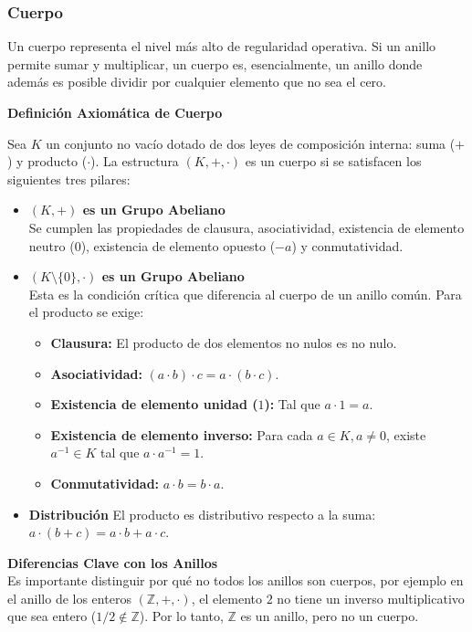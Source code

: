 \documentclass{article}
\begin{document}
\subsubsection{Cuerpo}
\label{sec:cuerpo}    
Un cuerpo representa el nivel más alto de regularidad operativa. Si un anillo permite sumar y multiplicar, un cuerpo es, esencialmente, un anillo donde además es posible dividir por cualquier elemento que no sea el cero.

\textbf{Definición Axiomática de Cuerpo}

Sea $K$ un conjunto no vacío dotado de dos leyes de composición interna: suma ($+$) y producto ($\cdot$). La estructura $(K, +, \cdot)$ es un cuerpo si se satisfacen los siguientes tres pilares:

\begin{itemize}
\item \textbf{$(K, +)$ es un Grupo Abeliano} \\
Se cumplen las propiedades de clausura, asociatividad, existencia de elemento neutro ($0$), existencia de elemento opuesto ($-a$) y conmutatividad.

\item \textbf{$(K \setminus \{0\}, \cdot)$ es un Grupo Abeliano} \\
Esta es la condición crítica que diferencia al cuerpo de un anillo común. Para el producto se exige:
\begin{itemize}
    \item \textbf{Clausura:} El producto de dos elementos no nulos es no nulo.
    \item \textbf{Asociatividad:} $(a \cdot b) \cdot c = a \cdot (b \cdot c)$.
    \item \textbf{Existencia de elemento unidad ($1$):} Tal que $a \cdot 1 = a$.
    \item \textbf{Existencia de elemento inverso:} Para cada $a \in K, a \neq 0$, existe $a^{-1} \in K$ tal que $a \cdot a^{-1} = 1$.
    \item \textbf{Conmutatividad:} $a \cdot b = b \cdot a$.
\end{itemize}

\item \textbf{Distribución}
El producto es distributivo respecto a la suma: $a \cdot (b + c) = a \cdot b + a \cdot c$.
\end{itemize}

\textbf{Diferencias Clave con los Anillos}\\
Es importante distinguir por qué no todos los anillos son cuerpos, por ejemplo en el anillo de los enteros $(\mathbb{Z}, +, \cdot)$, el elemento $2$ no tiene un inverso multiplicativo que sea entero ($1/2 \notin \mathbb{Z}$). Por lo tanto, $\mathbb{Z}$ es un anillo, pero no un cuerpo.
\end{document}
